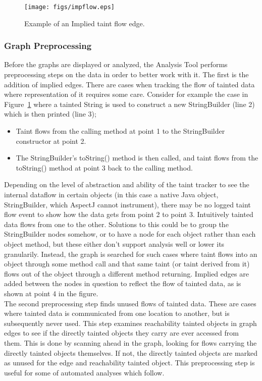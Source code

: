 \documentclass[msc,oneside]{ubcthesis}
\begin{document}
\begin{figure}[ht]
  \begin{center}
    \texttt{[image: figs/impflow.eps]}
    \caption[Example of an Implied taint flow edge.]{\label{fig:impflow} Example of an Implied taint flow edge.}
  \end{center}
\end{figure}

\subsubsection{Graph Preprocessing}
\label{subsub:impliededges}
Before the graphs are displayed or analyzed, the Analysis Tool performs preprocessing steps on the data in order to better work with it. The first is the addition of implied edges. There are cases when tracking the flow of tainted data where representation of it requires some care. Consider for example the case in Figure~\ref{fig:impflow} where a tainted String is used to construct a new StringBuilder (line 2) which is then printed (line 3); 
\begin{itemize}
\item Taint flows from the calling method at point 1 to the StringBuilder constructor at point 2.
\item The StringBuilder's toString() method is then called, and taint flows from the toString() method at point 3 back to the calling method.
\end{itemize}
Depending on the level of abstraction and ability of the taint tracker to see the internal dataflow in certain objects (in this case a native Java object, StringBuilder, which AspectJ cannot instrument), there may be no logged taint flow event to show how the data gets from point 2 to point 3. Intuitively tainted data flows from one to the other. Solutions to this could be to group the StringBuilder nodes somehow, or to have a node for each object rather than each object method, but these either don't support analysis well or lower its granularily. Instead, the graph is searched for such cases where taint flows into an object through some method call and that same taint (or taint derived from it) flows out of the object through a different method returning. Implied edges are added between the nodes in question to reflect the flow of tainted data, as is shown at point 4 in the figure.\\

The second preprocessing step finds unused flows of tainted data. These are cases where tainted data is communicated from one location to another, but is subsequently never used. This step examines reachability tainted objects in graph edges to see if the directly tainted objects they carry are ever accessed from them. This is done by scanning ahead in the graph, looking for flows carrying the directly tainted objects themselves. If not, the directly tainted objects are marked as unused for the edge and reachability tainted object. This preprocessing step is useful for some of automated analyses which follow.
\end{document}
